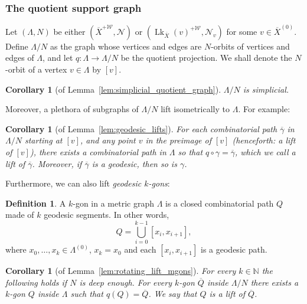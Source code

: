 \documentclass[svgnames]{amsart}
\theoremstyle{plain}
\newtheorem{cor}[thm]{Corollary}
\theoremstyle{definition}
\newtheorem{defn}[thm]{Definition}
\newcommand{\ov}[1]{\overline{#1}}
\newcommand{\link}{\operatorname{Lk}}
\newcommand{\N}{\mathcal{N}}
\newcommand{\W}{\mathcal{W}}
\begin{document}
\subsubsection{The quotient support graph}\label{subsec:support_for_quotient} 
Let $(\Lambda, N)$ be either $(\ov X^{+\W},\N)$ or $(\link_{\ov X}(v)^{+\W}, \N_v)$ for some $v\in\ov{X}^{(0)}$. Define $\Lambda/N$ as the graph whose vertices and edges are $N$-orbits of vertices and edges of $\Lambda$, and let $q\colon \Lambda\to \Lambda/N$ be the quotient projection. We shall denote the $N$-orbit of a vertex $v\in \Lambda$ by $[v]$. 
\begin{cor}[of Lemma~\ref{lem:simplicial_quotient_graph}]\label{cor:simplicial_x^w/n}
    $\Lambda/N$ is simplicial.
\end{cor}
Moreover, a plethora of subgraphs of $\Lambda/N$ lift isometrically to $\Lambda$. For example: 
\begin{cor}[of Lemma~\ref{lem:geodesic_lifts}]\label{lem:lift_geodesics_for_short}
For each combinatorial path $\ov\gamma$ in $\Lambda/N$ starting at $[v]$, and any point $v$ in the preimage of $[v]$ (henceforth: a lift of $[v]$), there exists a combinatorial path in $\Lambda$ so that $q\circ\gamma=\ov \gamma$, which we call a lift of $\ov\gamma$. Moreover, if $\ov\gamma$ is a geodesic, then so is $\gamma$.
\end{cor}

Furthermore, we can also lift \emph{geodesic $k$-gons}:
\begin{defn}\label{defn:kgon}
    A $k$-gon in a metric graph $\Lambda$ is a closed combinatorial path $Q$ made of $k$ geodesic segments. In other words,
    $$Q=\bigcup_{i=0}^{k-1}[x_i, x_{i+1}],$$
    where $x_0,\ldots,x_{k}\in\Lambda^{(0)}$, $x_{k}=x_0$ and each $[x_i, x_{i+1}]$ is a geodesic path.
\end{defn}


\begin{cor}[of Lemma~\ref{lem:rotating_lift_mgons}]\label{lem:lifting}
For every $k\in\mathbb{N}$ the following holds if $N$ is deep enough. For every $k$-gon $\ov{Q}$ inside $\Lambda/N$ there exists a $k$-gon $Q$ inside $\Lambda$ such that $q(Q)=\ov Q$. We say that $Q$ is a \emph{lift} of $\ov{Q}$.
\end{cor}
\end{document}
